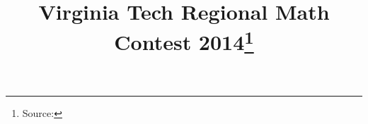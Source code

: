 \documentclass[10pt]{article}
\begin{document}
\title{Virginia Tech Regional Math Contest 2014\footnote{Source: \source}}
\author{\vspace{-2ex}}
\date{\vspace{-6ex}} %
\maketitle







\end{document}

